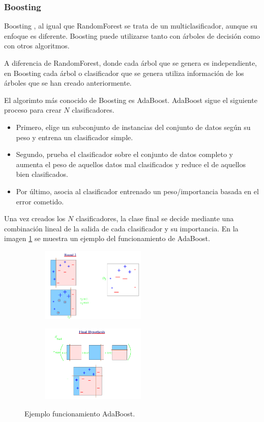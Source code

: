 \subsubsection{Boosting}
Boosting \cite{schapire1999brief}, al igual que RandomForest se trata de un multiclasificador, aunque su enfoque es diferente. Boosting puede utilizarse tanto con árboles de decisión como con otros algoritmos.\newline

A diferencia de RandomForest, donde cada árbol que se genera es independiente, en Boosting cada árbol o clasificador que se genera utiliza información de los árboles que se han creado anteriormente.\newline

El algorimto más conocido de Boosting es AdaBoost. AdaBoost sigue el siguiente proceso para crear $N$ clasificadores. 
\begin{itemize}
	\item Primero, elige un subconjunto de instancias del conjunto de datos según su peso y entrena un clasificador simple.
	\item Segundo, prueba el clasificador sobre el conjunto de datos completo y aumenta el peso de aquellos datos mal clasificados y reduce el de aquellos bien clasificados.
	\item Por último, asocia al clasificador entrenado un peso/importancia basada en el error cometido.
\end{itemize}
\verticalspace

Una vez creados los $N$ clasificadores, la clase final se decide mediante una combinación lineal de la salida de cada clasificador y su importancia. En la imagen \ref{fig:217} se muestra un ejemplo del funcionamiento de AdaBoost.\newline

\begin{figure}[h]
	\centering
	\begin{subfigure}{.4\textwidth}
		\centering
		\includegraphics[width=50mm]{imagenes/boosting_2.png}
	\end{subfigure}
	\hspace{0.01in}
	\begin{subfigure}{.4\textwidth}
		\centering
		\includegraphics[width=50mm]{imagenes/boosting_final.png}
	\end{subfigure}
	\caption{Ejemplo funcionamiento AdaBoost.}
	\label{fig:217}
\end{figure}
\verticalspace

